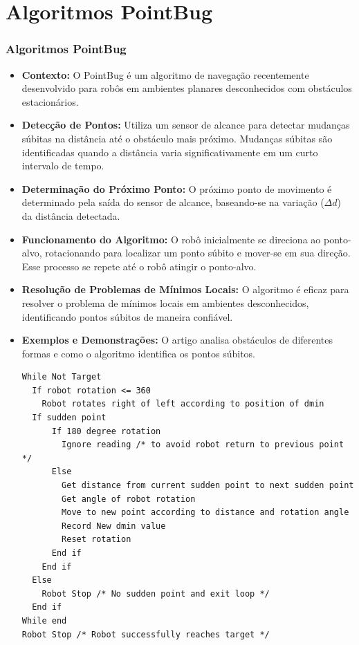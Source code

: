 \documentclass[xcolor=dvipsnames, aspectratio=169]{beamer}
\begin{document}
\section{Algoritmos PointBug}
\begin{frame}
  \frametitle{Algoritmos PointBug}
  \begin{itemize}
    \item \textbf{Contexto:} O PointBug é um algoritmo de navegação recentemente desenvolvido para robôs em ambientes planares desconhecidos com obstáculos estacionários.
    \item \textbf{Detecção de Pontos:} Utiliza um sensor de alcance para detectar mudanças súbitas na distância até o obstáculo mais próximo. Mudanças súbitas são identificadas quando a distância varia significativamente em um curto intervalo de tempo.
    \item \textbf{Determinação do Próximo Ponto:} O próximo ponto de movimento é determinado pela saída do sensor de alcance, baseando-se na variação ($\Delta{d}$) da distância detectada.
    \item \textbf{Funcionamento do Algoritmo:} O robô inicialmente se direciona ao ponto-alvo, rotacionando para localizar um ponto súbito e mover-se em sua direção. Esse processo se repete até o robô atingir o ponto-alvo.
    \item \textbf{Resolução de Problemas de Mínimos Locais:} O algoritmo é eficaz para resolver o problema de mínimos locais em ambientes desconhecidos, identificando pontos súbitos de maneira confiável.
    \item \textbf{Exemplos e Demonstrações:} O artigo \cite{buniyamin2011simple} analisa obstáculos de diferentes formas e como o algoritmo identifica os pontos súbitos.
\begin{lstlisting}
While Not Target
  If robot rotation <= 360
    Robot rotates right of left according to position of dmin
  If sudden point
      If 180 degree rotation
        Ignore reading /* to avoid robot return to previous point */
      Else
        Get distance from current sudden point to next sudden point
        Get angle of robot rotation
        Move to new point according to distance and rotation angle
        Record New dmin value
        Reset rotation
      End if
    End if
  Else
    Robot Stop /* No sudden point and exit loop */
  End if
While end
Robot Stop /* Robot successfully reaches target */
\end{lstlisting}
  \end{itemize}

\end{frame}
\end{document}
